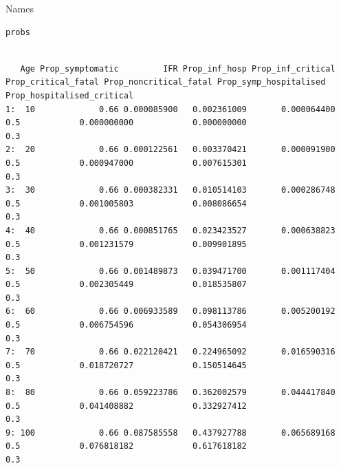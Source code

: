 \documentclass[11pt]{article}
\begin{document}
Names
\begin{verbatim}
probs
\end{verbatim}

\begin{verbatim}

   Age Prop_symptomatic         IFR Prop_inf_hosp Prop_inf_critical Prop_critical_fatal Prop_noncritical_fatal Prop_symp_hospitalised Prop_hospitalised_critical
1:  10             0.66 0.000085900   0.002361009       0.000064400                 0.5            0.000000000            0.000000000                        0.3
2:  20             0.66 0.000122561   0.003370421       0.000091900                 0.5            0.000947000            0.007615301                        0.3
3:  30             0.66 0.000382331   0.010514103       0.000286748                 0.5            0.001005803            0.008086654                        0.3
4:  40             0.66 0.000851765   0.023423527       0.000638823                 0.5            0.001231579            0.009901895                        0.3
5:  50             0.66 0.001489873   0.039471700       0.001117404                 0.5            0.002305449            0.018535807                        0.3
6:  60             0.66 0.006933589   0.098113786       0.005200192                 0.5            0.006754596            0.054306954                        0.3
7:  70             0.66 0.022120421   0.224965092       0.016590316                 0.5            0.018720727            0.150514645                        0.3
8:  80             0.66 0.059223786   0.362002579       0.044417840                 0.5            0.041408882            0.332927412                        0.3
9: 100             0.66 0.087585558   0.437927788       0.065689168                 0.5            0.076818182            0.617618182                        0.3
\end{verbatim}
\end{document}
